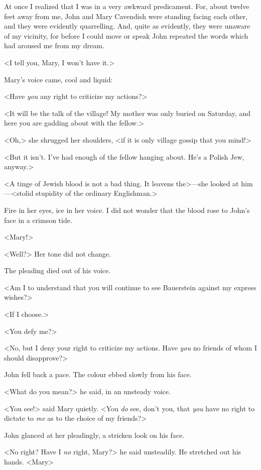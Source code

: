  At once I realized that I was in a very awkward predicament. For, about twelve feet away from me, John and Mary Cavendish were standing facing each other, and they were evidently quarrelling. And, quite as evidently, they were unaware of my vicinity, for before I could move or speak John repeated the words which had aroused me from my dream. 

 <I tell you, Mary, I won't have it.> 

 Mary's voice came, cool and liquid: 

 <Have \emph{you} any right to criticize my actions?> 

 <It will be the talk of the village! My mother was only buried on Saturday, and here you are gadding about with the fellow.> 

 <Oh,> she shrugged her shoulders, <if it is only village gossip that you mind!> 

 <But it isn't. I've had enough of the fellow hanging about. He's a Polish Jew, anyway.> 

 <A tinge of Jewish blood is not a bad thing. It leavens the>—she looked at him—<stolid stupidity of the ordinary Englishman.> 

 Fire in her eyes, ice in her voice. I did not wonder that the blood rose to John's face in a crimson tide. 

 <Mary!> 

 <Well?> Her tone did not change. 

 The pleading died out of his voice. 

 <Am I to understand that you will continue to see Bauerstein against my express wishes?> 

 <If I choose.> 

 <You defy me?> 

 <No, but I deny your right to criticize my actions. Have \emph{you} no friends of whom I should disapprove?> 

 John fell back a pace. The colour ebbed slowly from his face. 

 <What do you mean?> he said, in an unsteady voice. 

 <You see!> said Mary quietly. <You \emph{do} see, don't you, that \emph{you} have no right to dictate to \emph{me} as to the choice of my friends?> 

 John glanced at her pleadingly, a stricken look on his face. 

 <No right? Have I \emph{no} right, Mary?> he said unsteadily. He stretched out his hands. <Mary\longdash> 

